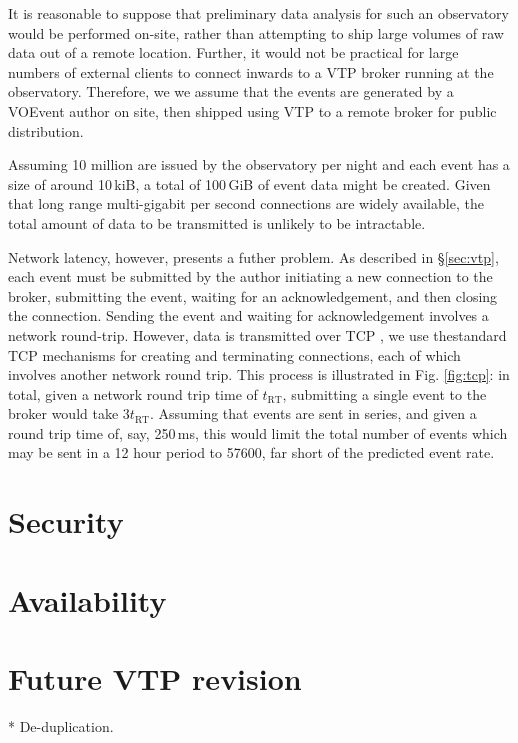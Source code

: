 \documentclass[5p,authoryear]{elsarticle}
\begin{document}
It is reasonable to suppose that preliminary data analysis for such an
observatory would be performed on-site, rather than attempting to ship large
volumes of raw data out of a remote location. Further, it would not be
practical for large numbers of external clients to connect inwards to a
VTP broker running at the observatory. Therefore, we we assume that the events
are generated by a VOEvent author on site, then shipped using VTP to a remote
broker for public distribution.

Assuming 10 million are issued by the observatory per night and each event
has a size of around 10\,kiB, a total of 100\,GiB of event data might be
created. Given that long range multi-gigabit per second connections are widely
available, the total amount of data to be transmitted is unlikely to be
intractable.

Network latency, however, presents a futher problem. As described in
\S\ref{sec:vtp}, each event must be submitted by the author initiating a new
connection to the broker, submitting the event, waiting for an
acknowledgement, and then closing the connection. Sending the event and
waiting for acknowledgement involves a network round-trip.  However, data is
transmitted over TCP \citep{Cerf:1974}, we use thestandard TCP mechanisms for
creating and terminating connections, each of which involves another network
round trip. This process is illustrated in Fig. \ref{fig:tcp}: in total, given
a network round trip time of $t_\mathrm{RT}$, submitting a single event to the
broker would take $3 t_\mathrm{RT}$. Assuming that events are sent in series,
and given a round trip time of, say, 250\,ms, this would limit the total
number of events which may be sent in a 12 hour period to 57600, far short of
the predicted event rate.

\section{Security}
\label{sec:security}

\section{Availability}
\label{sec:avail}

\section{Future VTP revision}
\label{sec:futurevtp}

* De-duplication.
\end{document}
